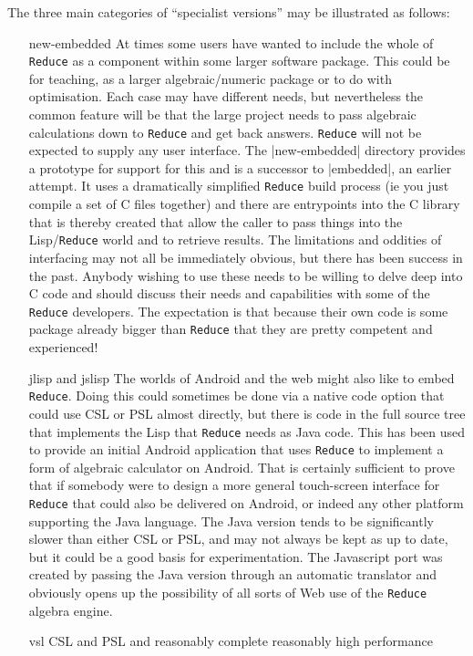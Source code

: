 \documentclass[12pt,twoside,openright]{memoir}
\newcommand{\reduce}{\texttt{Reduce}\xspace}
\begin{document}
The three main categories of ``specialist versions'' may be illustrated as
follows:
\begin{itemize}
\item[new-embedded] At times some users have wanted to include the whole of
\reduce as a component within some larger software package. This could be
for teaching, as a larger algebraic/numeric package or to do with optimisation.
Each case may have different needs, but nevertheless the common feature will be
that the large project needs to pass algebraic calculations down to \reduce and
get back answers. \reduce will not be expected to supply any user interface.
The |new-embedded| directory provides a prototype for support for this and is
a successor to |embedded|, an earlier attempt. It uses a dramatically
simplified \reduce build process (ie you just compile a set of C files together)
and there are entrypoints into the C library that is thereby created that
allow the caller to pass things into the Lisp/\reduce world and to retrieve
results. The limitations and oddities of interfacing may not all be immediately
obvious, but there has been success in the past. Anybody wishing to use
these needs to be willing to delve deep into C code and should discuss their
needs and capabilities with some of the \reduce developers. The expectation is
that because their own code is some package already bigger than \reduce that
they are pretty competent and experienced!
\item[jlisp and jslisp] The worlds of Android and the web might also like to
embed \reduce. Doing this could sometimes be done via a native code option
that could use CSL or PSL almost directly, but there is code in the full
source tree that implements the Lisp that \reduce needs as Java code. This
has been used to provide an initial Android application that uses \reduce
to implement a form of algebraic calculator on Android. That is certainly
sufficient to prove that if somebody were to design a more general  touch-screen
interface for \reduce that could also be delivered on Android, or indeed
any other platform supporting the Java language. The Java version tends to
be significantly slower than either CSL or PSL, and may not always be kept
as up to date, but it could be a good basis for experimentation. The Javascript
port was created by passing the Java version through an automatic translator
and obviously opens up the possibility of all sorts of Web use of the
\reduce algebra engine.
\item[vsl] CSL and PSL and reasonably complete reasonably high performance

\end{itemize}
\end{document}
